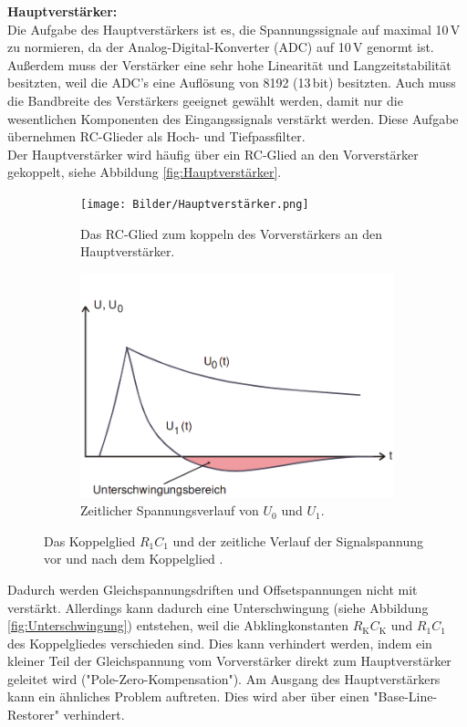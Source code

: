 \textbf{Hauptverstärker:} \\
Die Aufgabe des Hauptverstärkers ist es, die Spannungssignale auf maximal 10\,V zu normieren, da der Analog-Digital-Konverter (ADC) auf 10\,V genormt ist. Außerdem muss der Verstärker eine sehr hohe Linearität und Langzeitstabilität besitzten, weil die ADC's eine Auflösung von 8192 (13\,bit) besitzten. Auch muss die Bandbreite des Verstärkers geeignet gewählt werden, damit nur die wesentlichen Komponenten des Eingangssignals verstärkt werden. Diese Aufgabe übernehmen RC-Glieder als Hoch- und Tiefpassfilter. \\
Der Hauptverstärker wird häufig über ein RC-Glied an den Vorverstärker gekoppelt, siehe Abbildung \eqref{fig:Hauptverstärker}.

\begin{figure}[H]
	\centering
	\begin{subfigure}[t]{0.49\linewidth}
		\texttt{[image: Bilder/Hauptverstärker.png]}
		\caption{Das RC-Glied zum koppeln des Vorverstärkers an den Hauptverstärker.}
		\label{fig:Hauptverstärker}
	\end{subfigure}
	\hfill
	\begin{subfigure}[t]{0.49\linewidth}
		\includegraphics[width=\textwidth]{Bilder/Unterschwingung.png}
		\caption{Zeitlicher Spannungsverlauf von $U_0$ und $U_1$.}
		\label{fig:Unterschwingung}
	\end{subfigure}
  \caption{Das Koppelglied $R_1C_1$ und der zeitliche Verlauf der Signalspannung vor und nach dem Koppelglied \cite{V18}.}
\end{figure}

Dadurch werden Gleichspannungsdriften und Offsetspannungen nicht mit verstärkt. Allerdings kann dadurch eine Unterschwingung (siehe Abbildung \eqref{fig:Unterschwingung}) entstehen, weil die Abklingkonstanten $R_\text{K}C_\text{K}$ und $R_1C_1$ des Koppelgliedes verschieden sind. Dies kann verhindert werden, indem ein kleiner Teil der Gleichspannung vom Vorverstärker direkt zum Hauptverstärker geleitet wird ("Pole-Zero-Kompensation"). Am Ausgang des Hauptverstärkers kann ein ähnliches Problem auftreten. Dies wird aber über einen "Base-Line-Restorer" verhindert.

